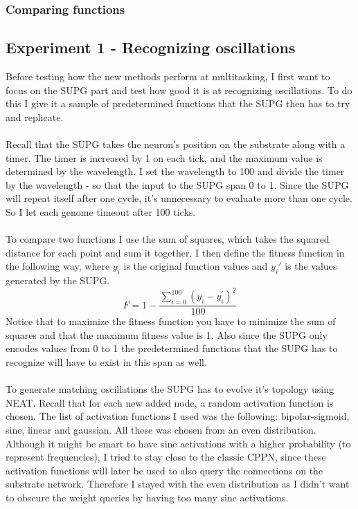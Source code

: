 \documentclass[11pt, a4paper]{article}
\begin{document}
\subsubsection{Comparing functions}
\subsection{Experiment 1 - Recognizing oscillations}
Before testing how the new methods perform at  multitasking, I first want to focus on the SUPG part and test how good it is at recognizing oscillations. To do this I give it a sample of predetermined functions that the SUPG then has to try and replicate.
\\
\\
Recall that the SUPG takes the neuron's position on the substrate along with a timer. The timer is increased by 1 on each tick, and the maximum value is determined by the wavelength. I set the wavelength to 100 and divide the timer by the wavelength - so that the input to the SUPG span 0 to 1. Since the SUPG will repeat itself after one cycle, it's unnecessary to evaluate more than one cycle. So I let each genome timeout after 100 ticks.
\\
\\
To compare two functions I use the sum of squares, which takes the squared distance for each point and sum it together. I then define the fitness function in the following way, where $ y_i $ is the original function values and $ y_i' $ is the values generated by the SUPG.
\begin{equation} F = 1 - \dfrac{\sum_{i=0}^{100}(y_i-y_i^{'})^2}{100} \end{equation}
Notice that to maximize the fitness function you have to minimize the sum of squares and that the maximum fitness value is 1. Also since the SUPG only encodes values from 0 to 1 the predetermined functions that the SUPG has to recognize will have to exist in this span as well.
\\
\\
To generate matching oscillations the SUPG has to evolve it's topology using NEAT. Recall that for each new added node, a random activation function is chosen. The list of activation functions I used was the following: bipolar-sigmoid, sine, linear and gaussian. All these was chosen from an even distribution. Although it might be smart to have sine activations with a higher probability (to represent frequencies), I tried to stay close to the classic CPPN, since these activation functions will later be used to also query the connections on the substrate network. Therefore I stayed with the even distribution as I didn't want to obscure the weight queries by having too many sine activations.
\end{document}
